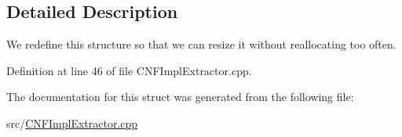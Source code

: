 \subsection{Detailed Description}
We redefine this structure so that we can resize it without reallocating too often. 

Definition at line 46 of file C\-N\-F\-Impl\-Extractor.\-cpp.



The documentation for this struct was generated from the following file\-:\begin{DoxyCompactItemize}
\item 
src/\hyperlink{CNFImplExtractor_8cpp}{C\-N\-F\-Impl\-Extractor.\-cpp}\end{DoxyCompactItemize}
